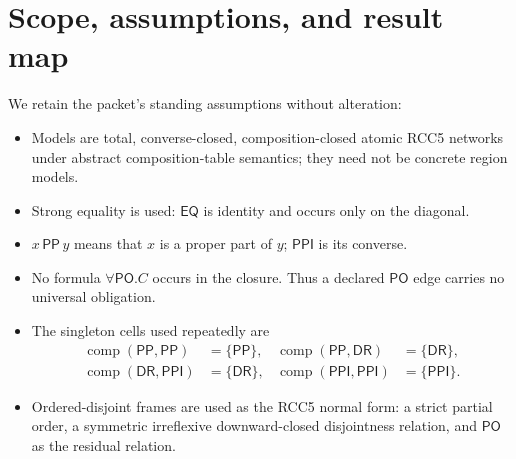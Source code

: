 \documentclass[11pt]{article}
\newcommand{\PP}{\mathsf{PP}}
\newcommand{\PPI}{\mathsf{PPI}}
\newcommand{\PO}{\mathsf{PO}}
\newcommand{\DR}{\mathsf{DR}}
\newcommand{\EQ}{\mathsf{EQ}}
\newcommand{\comp}{\operatorname{comp}}
\begin{document}
\begin{abstract}
The supplied attack packet isolates three open extraction problems for the mixed
$\exists\PO$/$\exists\PP$ quadrant of the $\forall\PO$-free fragment of
$\mathcal{ALCI}_{\mathrm{RCC5}}$. This report makes progress on all three. First, it gives a
finite simultaneous-rectangle theorem for finitely many interacting $\PP/\PPI$ towers.
Under the segment hypotheses stated in the packet, this proves the mathematical core
of Target B at paper level. Second, it proves that the proposed Target A label is always satisfiable but
constructs an eight-point ordered-disjoint countermodel showing that a common fresh
class-top need not be insertable. Blocking by model type alone is therefore insufficient;
a finite lower-context spectrum is a plausible replacement. Third, it refutes the natural
tail-stabilize/add-witness fixed point for Target C and factors the remaining problem into
postselection of uniform anchors followed by an ordered-disjoint PO-completion. The report
also records several defects in the supplied Python probes. All conclusions are scoped to
the abstract RCC5 composition-table semantics and the stated $\forall\PO$-free fragment.
No complete mixed-quadrant extraction or decidability theorem is claimed.
\end{abstract}

\tableofcontents
\clearpage
{}

\section{Scope, assumptions, and result map}

We retain the packet's standing assumptions without alteration:

\begin{itemize}
  \item Models are total, converse-closed, composition-closed atomic RCC5 networks under
        abstract composition-table semantics; they need not be concrete region models.
  \item Strong equality is used: $\EQ$ is identity and occurs only on the diagonal.
  \item $x\,\PP\,y$ means that $x$ is a proper part of $y$; $\PPI$ is its converse.
  \item No formula $\forall\PO.C$ occurs in the closure. Thus a declared $\PO$ edge carries
        no universal obligation.
  \item The singleton cells used repeatedly are
        \begin{align*}
          \comp(\PP,\PP)&=\{\PP\}, &
          \comp(\PP,\DR)&=\{\DR\},\\
          \comp(\DR,\PPI)&=\{\DR\}, &
          \comp(\PPI,\PPI)&=\{\PPI\}.
        \end{align*}
  \item Ordered-disjoint frames are used as the RCC5 normal form: a strict partial order,
        a symmetric irreflexive downward-closed disjointness relation, and $\PO$ as the
        residual relation.
\end{itemize}
\end{document}
